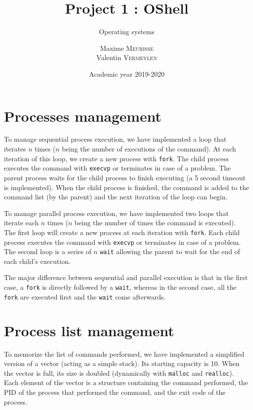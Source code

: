 \documentclass[a4paper, 12pt]{article}
\institute{University of Liège}
\title{Project 1 : OShell}
\subtitle{Operating systems}
\author{
    Maxime \textsc{Meurisse}\\
    Valentin \textsc{Vermeylen}\\
}
\date{Academic year 2019-2020}
\begin{document}
    \maketitle
    
    \section{Processes management}
    
    To manage sequential process execution, we have implemented a loop that iterates $n$ times ($n$ being the number of executions of the command). At each iteration of this loop, we create a new process with \texttt{fork}. The child process executes the command with \texttt{execvp} or terminates in case of a problem. The parent process waits for the child process to finish executing (a 5 second timeout is implemented). When the child process is finished, the command is added to the command list (by the parent) and the next iteration of the loop can begin.
    
    To manage parallel process execution, we have implemented two loops that iterate each $n$ times ($n$ being the number of times the command is executed). The first loop will create a new process at each iteration with \texttt{fork}. Each child process executes the command with \texttt{execvp} or terminates in case of a problem. The second loop is a series of $n$ \texttt{wait} allowing the parent to wait for the end of each child's execution.
    
    The major difference between sequential and parallel execution is that in the first case, a \texttt{fork} is directly followed by a \texttt{wait}, whereas in the second case, all the \texttt{fork} are executed first and the \texttt{wait} come afterwards.
    
    \section{Process list management}
    
    To memorize the list of commands performed, we have implemented a simplified version of a vector (acting as a simple stack). Its starting capacity is 10. When the vector is full, its size is doubled (dynamically with \texttt{malloc} and \texttt{realloc}). Each element of the vector is a structure containing the command performed, the PID of the process that performed the command, and the exit code of the process.
    
\end{document}

